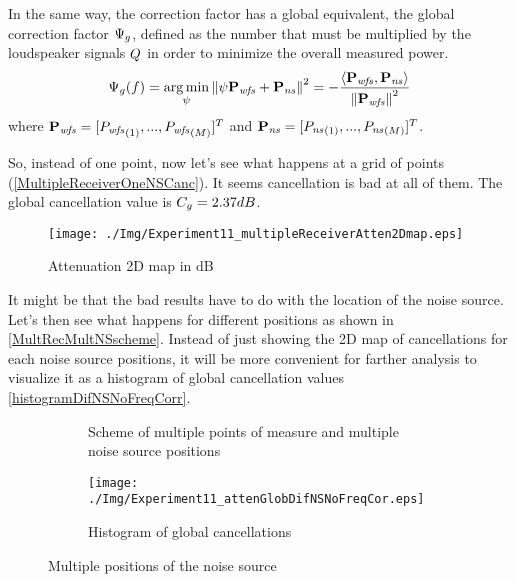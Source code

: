 In the same way, the correction factor has a global equivalent, the global correction factor $\Psi_g$, defined as the number that must be multiplied by the loudspeaker signals $\signal[wfs][frequency]$ in order to minimize the overall measured power.
\begin{equation}
\globalCorrectionFactor(f) = \argmin_{\psi} \norm{\psi \Field[wfs][frequency][vector] + \Field[ns][frequency][vector]}^2 = -\frac{\scalarProd{\Field[wfs][frequency][vector]}{\Field[ns][frequency][vector]}}{\norm{\Field[wfs][frequency][vector]}^2}
\end{equation}
where $\Field[wfs][frequency][vector] = [\Field[wfs][frequency][scalar][1],...,\Field[wfs][frequency][scalar][\numMeasPoints]]^T$ and $\Field[ns][frequency][vector] = [\Field[ns][frequency][scalar][1],...,\Field[ns][frequency][scalar][\numMeasPoints]]^T$.

So, instead of one point, now let's see what happens at a grid of points (\autoref{MultipleReceiverOneNSCanc}). It seems cancellation is bad at all of them. The global cancellation value is $C_g = 2.37 dB$. 

\begin{figure}
	\centering			\texttt{[image: ./Img/Experiment11\_multipleReceiverAtten2Dmap.eps]}
	\caption[Attenuation 2D map]{Attenuation 2D map in dB}
	\label{MultipleReceiverOneNSCanc}
\end{figure}

It might be that the bad results have to do with the location of the noise source. Let's then see what happens for different positions as shown in \autoref{MultRecMultNSscheme}. Instead of just showing the 2D map of cancellations for each noise source positions, it will be more convenient for farther analysis to visualize it as a histogram of global cancellation values
\autoref{histogramDifNSNoFreqCorr}.

\begin{figure}
	\centering
	\begin{subfigure}[b]{0.49\textwidth}
	\centering
	\caption[Scheme of multiple points of measure and multiple noise source positions]{Scheme of multiple points of measure and multiple noise source positions}
	\label{MultRecMultNSscheme}
	\end{subfigure}
	\begin{subfigure}[b]{0.49\textwidth}
	\centering
	\texttt{[image: ./Img/Experiment11\_attenGlobDifNSNoFreqCor.eps]}
	\caption{Histogram of global cancellations}
	\label{histogramDifNSNoFreqCorr}
	\end{subfigure}
	\caption{Multiple positions of the noise source}
\end{figure}

